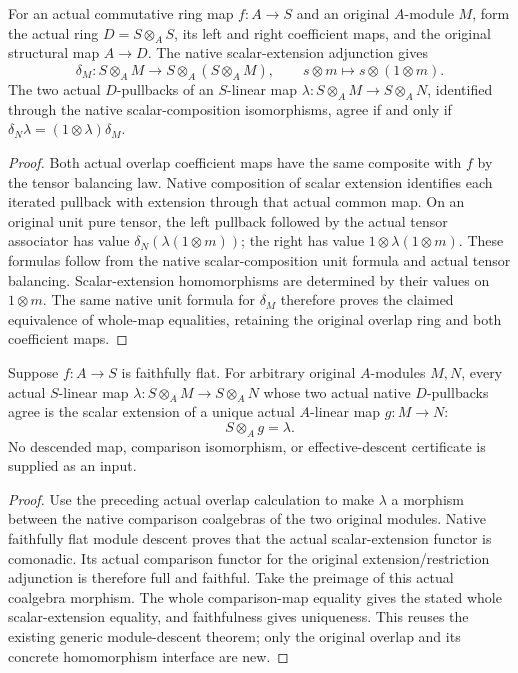 \begin{lemma}
\label{lem:kn-nadel-faithfully-flat-overlap-coaction}
\leanok
For an actual commutative ring map $f:A\to S$ and an original
$A$-module $M$, form the actual ring $D=S\otimes_A S$, its left and
right coefficient maps, and the original structural map $A\to D$.
The native scalar-extension adjunction gives
\[
 \delta_M:S\otimes_A M\longrightarrow S\otimes_A(S\otimes_A M),
 \qquad s\otimes m\longmapsto s\otimes(1\otimes m).
\]
The two actual $D$-pullbacks of an $S$-linear map
$\lambda:S\otimes_A M\to S\otimes_A N$, identified through the
native scalar-composition isomorphisms, agree if and only if
$\delta_N\lambda=(1\otimes\lambda)\delta_M$.
\end{lemma}
\begin{proof}
Both actual overlap coefficient maps have the same composite with
$f$ by the tensor balancing law.  Native composition of scalar
extension identifies each iterated pullback with extension through
that actual common map.  On an original unit pure tensor, the left
pullback followed by the actual tensor associator has value
$\delta_N(\lambda(1\otimes m))$; the right has value
$1\otimes\lambda(1\otimes m)$.  These formulas follow from the
native scalar-composition unit formula and actual tensor balancing.
Scalar-extension homomorphisms are determined by their values on
$1\otimes m$.  The same native unit formula for $\delta_M$ therefore
proves the claimed equivalence of whole-map equalities, retaining
the original overlap ring and both coefficient maps.
\end{proof}

\begin{theorem}
\label{thm:kn-nadel-faithfully-flat-module-map-descent}
\leanok
Suppose $f:A\to S$ is faithfully flat.  For arbitrary original
$A$-modules $M,N$, every actual $S$-linear map
$\lambda:S\otimes_A M\to S\otimes_A N$ whose two actual native
$D$-pullbacks agree is the scalar extension of a unique actual
$A$-linear map $g:M\to N$:
\[
 S\otimes_A g=\lambda.
\]
No descended map, comparison isomorphism, or effective-descent
certificate is supplied as an input.
\end{theorem}
\begin{proof}
Use the preceding actual overlap calculation to make $\lambda$ a
morphism between the native comparison coalgebras of the two
original modules.  Native faithfully flat module descent proves
that the actual scalar-extension functor is comonadic.  Its actual
comparison functor for the original extension/restriction adjunction
is therefore full and faithful.  Take the preimage of this actual
coalgebra morphism.  The whole comparison-map equality gives the
stated whole scalar-extension equality, and faithfulness gives
uniqueness.  This reuses the existing generic module-descent theorem;
only the original overlap and its concrete homomorphism interface
are new.
\end{proof}

